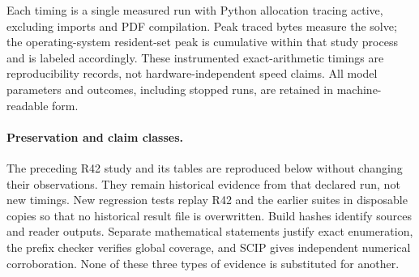 Each timing is a single measured run with Python allocation tracing active, excluding imports and PDF compilation. Peak traced bytes measure the solve; the operating-system resident-set peak is cumulative within that study process and is labeled accordingly. These instrumented exact-arithmetic timings are reproducibility records, not hardware-independent speed claims. All model parameters and outcomes, including stopped runs, are retained in machine-readable form.

\paragraph{Preservation and claim classes.}
The preceding R42 study and its tables are reproduced below without changing their observations. They remain historical evidence from that declared run, not new timings. New regression tests replay R42 and the earlier suites in disposable copies so that no historical result file is overwritten. Build hashes identify sources and reader outputs. Separate mathematical statements justify exact enumeration, the prefix checker verifies global coverage, and SCIP gives independent numerical corroboration. None of these three types of evidence is substituted for another.
